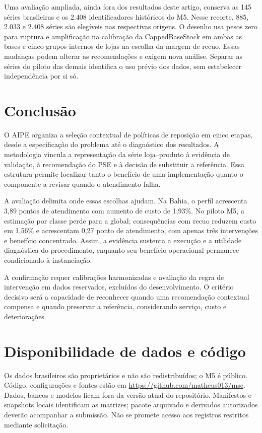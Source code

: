 \documentclass[preprint,12pt]{elsarticle}
\begin{document}
Uma avaliação ampliada, ainda fora dos resultados deste artigo, conserva as 145 séries brasileiras e os 2.408 identificadores históricos do M5. Nesse recorte, 885, 2.033 e 2.408 séries são elegíveis nas respectivas origens. O desenho usa pesos zero para ruptura e amplificação na calibração da CappedBaseStock em ambas as bases e cinco grupos internos de lojas na escolha da margem de recuo. Essas mudanças podem alterar as recomendações e exigem nova análise. Separar as séries do piloto das demais identifica o uso prévio dos dados, sem estabelecer independência por si só.

\section{Conclusão}
O AIPE organiza a seleção contextual de políticas de reposição em cinco etapas, desde a especificação do problema até o diagnóstico dos resultados. A metodologia vincula a representação da série loja--produto à evidência de validação, à recomendação do PSE e à decisão de substituir a referência. Essa estrutura permite localizar tanto o benefício de uma implementação quanto o componente a revisar quando o atendimento falha.

A avaliação delimita onde essas escolhas ajudam. Na Bahia, o perfil acrescenta 3,89 pontos de atendimento com aumento de custo de 1,93\%. No piloto M5, a estimação por classe perde para a global; consequências com recuo reduzem custo em 1,56\% e acrescentam 0,27 ponto de atendimento, com apenas três intervenções e benefício concentrado. Assim, a evidência sustenta a execução e a utilidade diagnóstica do procedimento, enquanto seu benefício operacional permanece condicionado à instanciação.

A confirmação requer calibrações harmonizadas e avaliação da regra de intervenção em dados reservados, excluídos do desenvolvimento. O critério decisivo será a capacidade de reconhecer quando uma recomendação contextual compensa e quando preservar a referência, considerando serviço, custo e deteriorações.

\section*{Disponibilidade de dados e código}
Os dados brasileiros são proprietários e não são redistribuídos; o M5 é público. Código, configurações e fontes estão em \url{https://github.com/matheus013/msc}. Dados, bancos e modelos ficam fora da versão atual do repositório. Manifestos e snapshots locais identificam as matrizes; pacote arquivado e derivados autorizados deverão acompanhar a submissão. Não se promete acesso aos registros restritos mediante solicitação.
\end{document}
